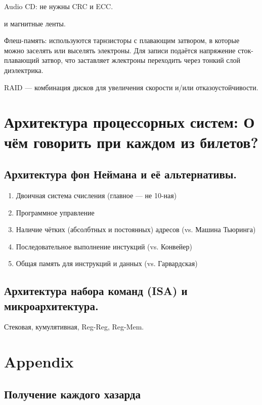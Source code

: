 \documentclass[12pt, a4paper]{article}
\begin{document}
Audio CD: не нужны CRC и ECC.




и магнитные ленты.

Флеш-память: используются тарнзисторы с плавающим затвором, в которые можно заселять или выселять электроны.
Для записи подаётся напряжение сток-плавающий затвор, что заставляет жлектроны переходить через тонкий слой диэлектрика.

RAID — комбинация дисков для увеличения скорости и/или отказоустойчивости.


\section{Архитектура процессорных систем: О чём говорить при каждом из билетов?}

\subsection{Архитектура фон Неймана и её альтернативы.}

\begin{enumerate}
    \item Двоичная система счисления (главное — не 10-ная)
    \item Программное управление
    \item Наличие чётких (абсолбтных и постоянных) адресов (vs. Машина Тьюринга)
    \item Последовательное выполнение инстукций (vs. Конвейер)
    \item Общая память для инструкций и данных (vs. Гарвардская)
\end{enumerate}



\subsection{Архитектура набора команд (ISA) и микроархитектура.}

Стековая, кумулятивная, Reg-Reg, Reg-Mem.




\section{Appendix}

\subsection{Получение каждого хазарда}
\end{document}
